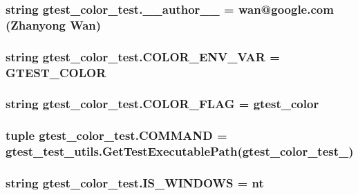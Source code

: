 \subsubsection[{\+\_\+\+\_\+author\+\_\+\+\_\+}]{\setlength{\rightskip}{0pt plus 5cm}string gtest\+\_\+color\+\_\+test.\+\_\+\+\_\+author\+\_\+\+\_\+ = \textquotesingle{}wan@google.\+com (Zhanyong Wan)\textquotesingle{}}\label{namespacegtest__color__test_aed3212d01eb48ec3b2ce43de461f9e84}
\hypertarget{namespacegtest__color__test_aa6deaa7da27bcc115fe666abad13419c}{}
\subsubsection[{C\+O\+L\+O\+R\+\_\+\+E\+N\+V\+\_\+\+V\+A\+R}]{\setlength{\rightskip}{0pt plus 5cm}string gtest\+\_\+color\+\_\+test.\+C\+O\+L\+O\+R\+\_\+\+E\+N\+V\+\_\+\+V\+A\+R = \textquotesingle{}G\+T\+E\+S\+T\+\_\+\+C\+O\+L\+O\+R\textquotesingle{}}\label{namespacegtest__color__test_aa6deaa7da27bcc115fe666abad13419c}
\hypertarget{namespacegtest__color__test_af5818cea608c0551909fefbeaf0edf20}{}
\subsubsection[{C\+O\+L\+O\+R\+\_\+\+F\+L\+A\+G}]{\setlength{\rightskip}{0pt plus 5cm}string gtest\+\_\+color\+\_\+test.\+C\+O\+L\+O\+R\+\_\+\+F\+L\+A\+G = \textquotesingle{}gtest\+\_\+color\textquotesingle{}}\label{namespacegtest__color__test_af5818cea608c0551909fefbeaf0edf20}
\hypertarget{namespacegtest__color__test_aeea73d02198b607c38e9dccb97235322}{}
\subsubsection[{C\+O\+M\+M\+A\+N\+D}]{\setlength{\rightskip}{0pt plus 5cm}tuple gtest\+\_\+color\+\_\+test.\+C\+O\+M\+M\+A\+N\+D = {\bf gtest\+\_\+test\+\_\+utils.\+Get\+Test\+Executable\+Path}(\textquotesingle{}gtest\+\_\+color\+\_\+test\+\_\+\textquotesingle{})}\label{namespacegtest__color__test_aeea73d02198b607c38e9dccb97235322}
\hypertarget{namespacegtest__color__test_a0d4451a99f88105308f0842eb3ec2938}{}
\subsubsection[{I\+S\+\_\+\+W\+I\+N\+D\+O\+W\+S}]{\setlength{\rightskip}{0pt plus 5cm}string gtest\+\_\+color\+\_\+test.\+I\+S\+\_\+\+W\+I\+N\+D\+O\+W\+S = \textquotesingle{}nt\textquotesingle{}}\label{namespacegtest__color__test_a0d4451a99f88105308f0842eb3ec2938}
